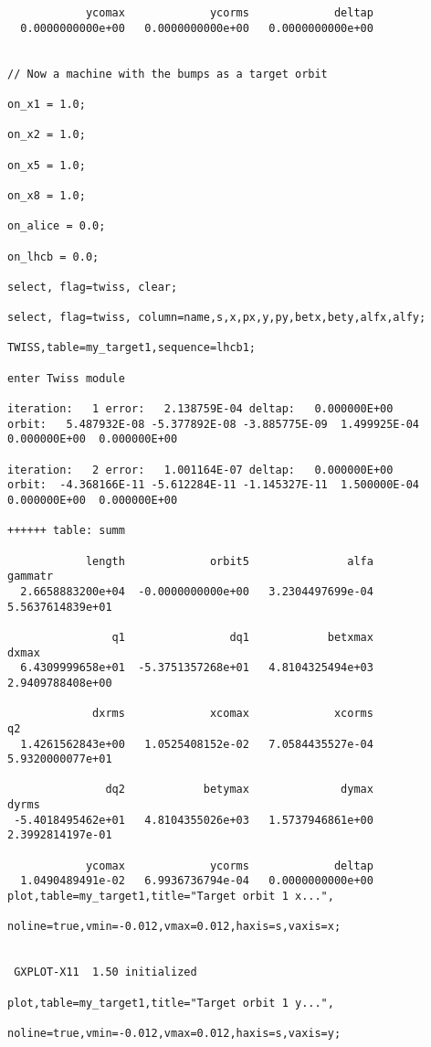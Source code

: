 \begin{verbatim}
            ycomax             ycorms             deltap 
  0.0000000000e+00   0.0000000000e+00   0.0000000000e+00 


// Now a machine with the bumps as a target orbit 

on_x1 = 1.0;

on_x2 = 1.0;

on_x5 = 1.0;

on_x8 = 1.0;

on_alice = 0.0;

on_lhcb = 0.0;

select, flag=twiss, clear;

select, flag=twiss, column=name,s,x,px,y,py,betx,bety,alfx,alfy;

TWISS,table=my_target1,sequence=lhcb1; 

enter Twiss module
  
iteration:   1 error:   2.138759E-04 deltap:   0.000000E+00
orbit:   5.487932E-08 -5.377892E-08 -3.885775E-09  1.499925E-04  0.000000E+00  0.000000E+00
  
iteration:   2 error:   1.001164E-07 deltap:   0.000000E+00
orbit:  -4.368166E-11 -5.612284E-11 -1.145327E-11  1.500000E-04  0.000000E+00  0.000000E+00

++++++ table: summ

            length             orbit5               alfa            gammatr 
  2.6658883200e+04  -0.0000000000e+00   3.2304497699e-04   5.5637614839e+01 

                q1                dq1            betxmax              dxmax 
  6.4309999658e+01  -5.3751357268e+01   4.8104325494e+03   2.9409788408e+00 

             dxrms             xcomax             xcorms                 q2 
  1.4261562843e+00   1.0525408152e-02   7.0584435527e-04   5.9320000077e+01 

               dq2            betymax              dymax              dyrms 
 -5.4018495462e+01   4.8104355026e+03   1.5737946861e+00   2.3992814197e-01 

            ycomax             ycorms             deltap 
  1.0490489491e-02   6.9936736794e-04   0.0000000000e+00 
plot,table=my_target1,title="Target orbit 1 x...",

noline=true,vmin=-0.012,vmax=0.012,haxis=s,vaxis=x;


 GXPLOT-X11  1.50 initialized

plot,table=my_target1,title="Target orbit 1 y...",

noline=true,vmin=-0.012,vmax=0.012,haxis=s,vaxis=y;




\end{verbatim}
